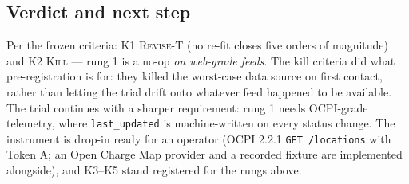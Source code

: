 \documentclass[twoside,twocolumn,usenatbib]{mnras}
\begin{document}
\subsection{Verdict and next step}

Per the frozen criteria: K1 \textsc{Revise-T} (no re-fit closes
five orders of magnitude) and K2 \textsc{Kill} --- rung 1 is a
no-op \emph{on web-grade feeds}.  The kill criteria did what
pre-registration is for: they killed the worst-case data source on
first contact, rather than letting the trial drift onto whatever
feed happened to be available.  The trial continues with a sharper
requirement: rung 1 needs OCPI-grade telemetry,
where \texttt{last\_updated} is machine-written on every status
change.  The instrument is drop-in ready for an operator (OCPI
2.2.1 \texttt{GET /locations} with Token A; an Open Charge Map
provider and a recorded fixture are implemented alongside), and
K3--K5 stand registered for the rungs above.
\end{document}
